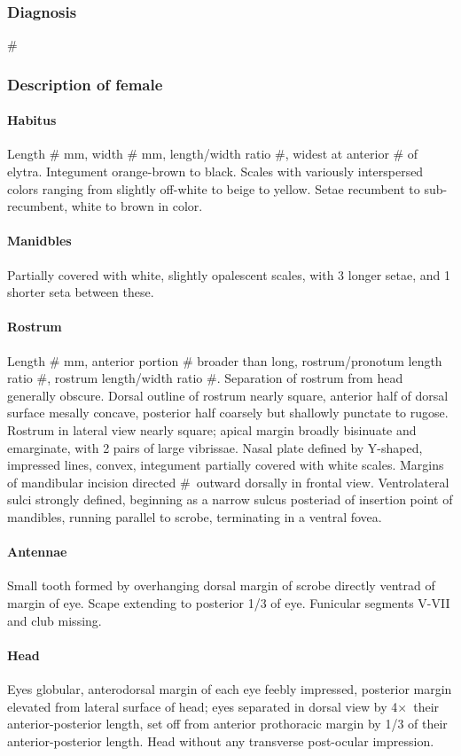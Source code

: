 \documentclass[fleqn,10pt,lineno]{wlpeerj} %
\newcommand{\td}{\textdegree~}
\newcommand{\x}{$\times$~}
\begin{document}
		\subsubsection*{Diagnosis}
			\#
		\subsubsection*{Description of female}
			\paragraph{Habitus}
				Length \# mm, width \# mm, length/width ratio \#, widest at anterior \# of elytra.
				Integument orange-brown to black. 
				Scales with variously interspersed colors ranging from slightly off-white to beige to yellow. 
				Setae recumbent to sub-recumbent, white to brown in color.
			\paragraph{Manidbles}
				Partially covered with white, slightly opalescent scales, with 3 longer setae, and 1 shorter seta between these.
			\paragraph{Rostrum}
				Length \# mm, anterior portion \# broader than long, rostrum/pronotum length ratio \#, rostrum length/width ratio \#.
				Separation of rostrum from head generally obscure. 
				Dorsal outline of rostrum nearly square, anterior half of dorsal surface mesally concave, posterior half coarsely but shallowly punctate to rugose. 
				Rostrum in lateral view nearly square; apical margin broadly bisinuate and emarginate, with 2 pairs of large vibrissae. 
				Nasal plate defined by Y-shaped, impressed lines, convex, integument partially covered with white scales.
				Margins of mandibular incision directed \#\td outward dorsally in frontal view. 
				Ventrolateral sulci strongly defined, beginning as a narrow sulcus posteriad of insertion point of mandibles, running parallel to scrobe, terminating in a ventral fovea.
			\paragraph{Antennae}
				Small tooth formed by overhanging dorsal margin of scrobe directly ventrad of margin of eye.
				Scape extending to posterior 1/3 of eye.
				Funicular segments V-VII and club missing.
			\paragraph{Head}
				Eyes globular, anterodorsal margin of each eye feebly impressed, posterior margin elevated from lateral surface of head; eyes separated in dorsal view by 4\x their anterior-posterior length, set off from anterior prothoracic margin by 1/3 of their anterior-posterior length. 
				Head without any transverse post-ocular impression.
\end{document}
